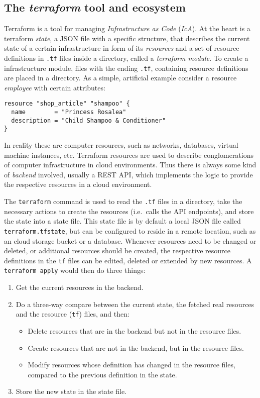 \documentclass[paper=a4,11pt,numbers=noenddot]{article}
\begin{document}
\subsection{The \emph{terraform} tool and ecosystem}
\label{subsec:terr-tool-ecosyst}

Terraform is a tool for managing \emph{Infrastructure as Code} (\emph{IcA}). At the heart is a terraform \emph{state}, a JSON file with a specific structure, that describes the current state of a certain infrastructure in form of its \emph{resources} and a set of resource definitions in \verb'.tf' files inside a directory, called a \emph{terraform module}. To create a infrastructure module, files with the ending \verb'.tf', containing resource definitions are placed in a directory. As a simple, artificial example consider a resource \emph{employee} with certain attributes:

\begin{lstlisting}
resource "shop_article" "shampoo" {
  name        = "Princess Rosalea"
  description = "Child Shampoo & Conditioner"
}
\end{lstlisting}

In reality these are computer resources, such as networks, databases, virtual machine instances, etc. Terraform resources are used to describe conglomerations of computer infrastructure in cloud environments. Thus there is always some kind of \emph{backend} involved, usually a REST API, which implements the logic to provide the respective resources in a cloud environment.

The \verb'terraform' command is used to read the \verb'.tf' files in a directory, take the necessary actions to create the resources (i.e.\ calls the API endpoints), and store the state into a state file. This state file is by default a local JSON file called \verb'terraform.tfstate', but can be configured to reside in a remote location, such as an cloud storage bucket or a database. Whenever resources need to be changed or deleted, or additional resources should be created, the respective resource definitions in the \verb'tf' files can be edited, deleted or extended by new resources. A \verb'terraform apply' would then do three things:

\begin{enumerate}
\item\label{itm:tf-read} Get the current resources in the backend.
\item\label{itm:tf-compare} Do a three-way compare between the current state, the fetched real resources and the resource (\verb'tf') files, and then:
  \begin{itemize}
  \item Delete resources that are in the backend but not in the resource files.
  \item Create resources that are not in the backend, but in the resource files.
  \item Modify resources whose definition has changed in the resource files, compared to the previous definition in the state.
  \end{itemize}
\item\label{itm:tf-create-update} Store the new state in the state file.
\end{enumerate}
\end{document}
